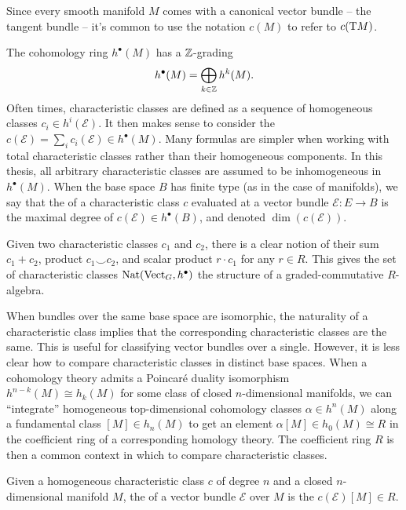 \begin{convention*}
	Since every smooth manifold $M$ comes with a canonical vector bundle -- the tangent bundle -- it's common to use the notation $c(M)$ to refer to $c(\mathrm{T} M)$.
\end{convention*}

\begin{remark}
	The cohomology ring $h^\bullet(M)$ has a $\mathbb{Z}$-grading
	\[
		h^\bullet(M) = \bigoplus_{k\in \mathbb{Z}} h^k(M).
	\]
	Often times, characteristic classes are defined as a sequence of homogeneous classes $c_i\in h^{i}(\mathcal{E})$. It then makes sense to consider the  $c(\mathcal{E})=\sum_i c_i(\mathcal{E})\in h^\bullet(M)$. Many formulas are simpler when working with total characteristic classes rather than their homogeneous components. In this thesis, all arbitrary characteristic classes are assumed to be inhomogeneous in $h^\bullet(M)$. When the base space $B$ has finite type (as in the case of manifolds), we say that the  of a characteristic class $c$ evaluated at a vector bundle $\mathcal{E} : E \to B$ is the maximal degree of $c(\mathcal{E})\in h^\bullet(B)$, and denoted $\dim(c(\mathcal{E}))$.
\end{remark}

\begin{remark}
	Given two characteristic classes $c_1$ and $c_2$, there is a clear notion of their sum $c_1+c_2$, product $c_1\smile c_2$, and scalar product $r\cdot c_1$ for any $r\in R$. This gives the set of characteristic classes $\operatorname{Nat}(\operatorname{Vect}_G, h^\bullet)$ the structure of a graded-commutative $R$-algebra.
\end{remark}

When bundles over the same base space are isomorphic, the naturality of a characteristic class implies that the corresponding characteristic classes are the same. This is useful for classifying vector bundles over a single. However, it is less clear how to compare characteristic classes in distinct base spaces.
When a cohomology theory admits a Poincar\'e duality isomorphism $h^{n-k}(M) \cong h_k(M)$ for some class of closed $n$-dimensional manifolds, we can ``integrate'' homogeneous top-dimensional cohomology classes $\alpha\in h^{n}(M)$ along a fundamental class $[M]\in h_n(M)$ to get an element $\alpha[M]\in h_0(M)\cong R$ in the coefficient ring of a corresponding homology theory. The coefficient ring $R$ is then a common context in which to compare characteristic classes.

\begin{definition}\label{defn:characteristic-numbers}
	Given a homogeneous characteristic class $c$ of degree $n$ and a closed $n$-dimensional manifold $M$, the  of a vector bundle $\mathcal{E}$ over $M$ is the $c(\mathcal{E})[M] \in R$.
\end{definition}

